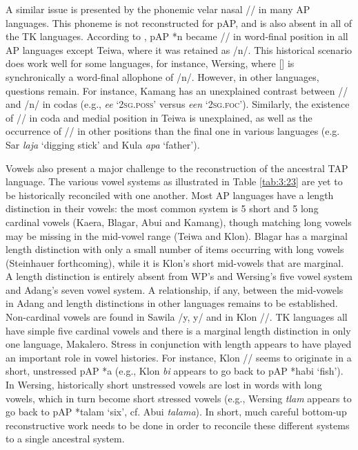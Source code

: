 A similar issue is presented by the phonemic velar nasal /{\ng}/ in many AP languages. This phoneme is not reconstructed for pAP, and is also absent in all of the TK languages. According to \citet{HoltonRobinsonTV}, pAP *n became /{\ng}/ in word-final position in all AP languages except Teiwa, where it was retained as /n/. This historical scenario does work well for some languages, for instance, Wersing, where [{\ng}] is synchronically a word-final allophone of /n/. However, in other languages, questions remain. For instance, Kamang has an unexplained contrast between /{\ng}/ and /n/ in codas (e.g., \textit{ee{\ng}} `\textsc{2sg.poss'} versus \textit{een} `\textsc{2sg.foc'}). Similarly, the existence of /{\ng}/ in coda and medial position in Teiwa is unexplained, as well as the occurrence of /{\ng}/ in other positions than the final one in various languages (e.g. Sar \textit{la{\ng}ja} `digging stick' and Kula \textit{{\ng}apa} `father'). 

Vowels also present a major challenge to the reconstruction of the ancestral TAP language. The various vowel systems as illustrated in Table \ref{tab:3:23} are yet to be historically reconciled with one another. Most AP languages have a length distinction in their vowels: the most common system is 5 short and 5 long cardinal vowels (Kaera, Blagar, Abui and Kamang), though matching long vowels may be missing in the mid-vowel range (Teiwa and Klon). Blagar has a marginal length distinction with only a small number of items occurring with long vowels (Steinhauer forthcoming), while it is Klon's short mid-vowels that are marginal. A length distinction is entirely absent from WP's and Wersing's five vowel system and Adang's seven vowel system. A relationship, if any, between the mid-vowels in Adang and length distinctions in other languages remains to be established. Non-cardinal vowels are found in Sawila /y, y{\textlengthmark}/ and in Klon /{\textschwa}/. TK languages all have simple five cardinal vowels and there is a marginal length distinction in only one language, Makalero. Stress in conjunction with length appears to have played an important role in vowel histories. For instance, Klon /{\textschwa}/ seems to originate in a short, unstressed pAP *a (e.g., Klon \textit{{\textschwa}bi} appears to go back to pAP *ha{\textprimstress}bi `fish'). In Wersing, historically short unstressed vowels are lost in words with long vowels, which in turn become short stressed vowels (e.g., Wersing \textit{tlam} appears to go back to pAP *tala{\textlengthmark}m `six', cf. Abui \textit{tala{\textlengthmark}ma}). In short, much careful bottom-up reconstructive work needs to be done in order to reconcile these different systems to a single ancestral system.
 

